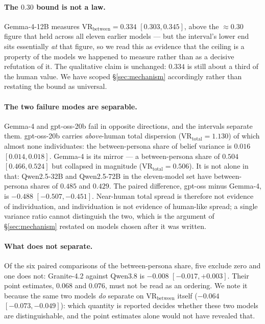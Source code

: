 \documentclass[11pt]{article}
\begin{document}
\paragraph{The $0.30$ bound is not a law.} Gemma-4-12B measures
$\mathrm{VR}_\text{between}=0.334$ $[0.303,0.345]$, above the $\approx0.30$
figure that held across all eleven earlier models --- but the interval's lower
end sits essentially \emph{at} that figure, so we read this as evidence that the
ceiling is a property of the models we happened to measure rather than as a
decisive refutation of it. The qualitative claim is unchanged: $0.334$ is still
about a third of the human value. We have scoped
\S\ref{sec:mechanism} accordingly rather than restating the bound as universal.

\paragraph{The two failure modes are separable.} Gemma-4 and gpt-oss-20b fail in
opposite directions, and the intervals separate them. gpt-oss-20b carries
\emph{above}-human total dispersion ($\mathrm{VR}_\text{total}=1.130$) of which
almost none individuates: the between-persona share of belief variance is
$0.016$ $[0.014,0.018]$. Gemma-4 is its mirror --- a between-persona share of
$0.504$ $[0.466,0.524]$ but collapsed in magnitude
($\mathrm{VR}_\text{total}=0.506$). It is not alone in that: Qwen2.5-32B and
Qwen2.5-72B in the eleven-model set have between-persona shares of $0.485$ and
$0.429$. The paired difference, gpt-oss minus Gemma-4, is
$-0.488$ $[-0.507,-0.451]$. Near-human total spread is therefore not evidence of
individuation, and individuation is not evidence of human-like spread; a single
variance ratio cannot distinguish the two, which is the argument of
\S\ref{sec:mechanism} restated on models chosen after it was written.

\paragraph{What does not separate.} Of the six paired comparisons of the
between-persona share, five exclude zero and one does not: Granite-4.2 against
Qwen3.8 is $-0.008$ $[-0.017,+0.003]$. Their point estimates, $0.068$ and
$0.076$, must not be read as an ordering. We note it because the same two models
\emph{do} separate on $\mathrm{VR}_\text{between}$ itself ($-0.064$
$[-0.073,-0.049]$): which quantity is reported decides whether these two models
are distinguishable, and the point estimates alone would not have revealed that.
\end{document}
